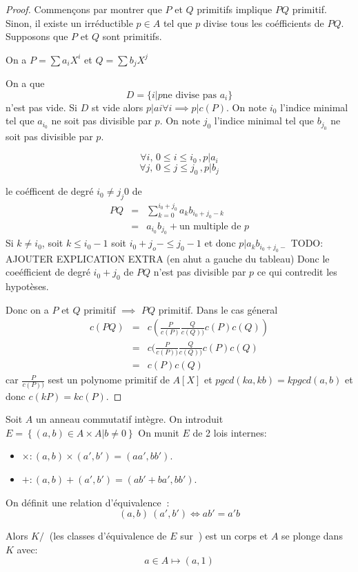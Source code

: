 \begin{proof}
	Commençons par montrer que $P$ et $Q$ primitifs implique $PQ$ primitif. \\
	Sinon, il existe un irréductible $p \in A $ tel que $p$ divise tous les coéfficients de $PQ$.
	Supposons que $P$ et $Q$ sont primitifs.

	On a $P = \sum a_iX^i$ et  $Q = \sum b_jX^j$

	On a que $$D = \{i | p \text{ne divise pas } a_i \}$$ n'est pas vide. Si $D$ st vide alors $p | ai \forall i \implies p | c(P)$.
	On note $i_0$ l'indice minimal tel que $a_{i_0}$ ne soit pas divisible par $p$.
	On note $j_0$ l'indice minimal tel que $b_{j_0}$ ne soit pas divisible par $p$.

	$$\forall i, \, 0 \leq i \leq i_0\,, p | a_i$$
	$$\forall j, \, 0 \leq j \leq j_0\,, p | b_j$$


	le coéfficent de degré $i_0 \neq j_j0$ de
	\begin{eqnarray*}
    PQ &=& \sum\limits^{i_0 + j_0}_{k=0} a_k b_{i_0 + j_0 - k} \\
		&=& a_{i_0}b_{j_0} + \text{un multiple de } p
	\end{eqnarray*}
	Si $k \neq i_0$, soit  $k\leq i_0 -1$ soit $i_0+j_o - \leq j_0 -1$ et donc $ p | a_kb_{i_0 + j_0 - }$
	TODO: AJOUTER EXPLICATION EXTRA (en ahut a gauche du tableau)
	Donc le coeéfficient de degré $i_0+j_0$ de $PQ$ n'est pas divisible par $p$ ce qui contredit les hypotèses.

	Donc on a $P$ et $Q$ primitif $\implies$ $PQ$ primitif.
	Dans le cas géneral
	\begin{eqnarray*}
		c(PQ) &=& c(\frac{P}{c(P)}\frac{Q}{c(Q))}c(P)c(Q))\\
		&=& c(\frac{P}{c(P))}\frac{Q}{c(Q))}c(P)c(Q)\\
		&=& c(P)c(Q)
	\end{eqnarray*}
	car $\frac{P}{c(P))}$ sest un polynome primitif de $A[X]$ et
	$pgcd(ka, kb) = k pgcd(a,b)$ et donc $c(kP) = kc(P)$.
\end{proof}


\begin{definition}
	Soit $A$ un anneau  commutatif intègre.
	On introduit $E = \left\{ (a,b) \in A\times A | b \neq 0 \right\}$ %
	On munit  $E$ de 2 lois internes:
	\begin{itemize}
		\item $\times : (a,b) \times (a', b') = (aa',bb')$.
		\item $+ : (a,b) + (a', b') = (ab' + ba',bb')$.
	\end{itemize}

	On définit une relation d'équivalence $~$:
	$$ (a,b) ~ (a',b') \iff ab' = a'b $$

	Alors $K/~$ (les classes d'équivalence de $E$ sur $~$) est un corps et $A$ se plonge dans $K$ avec:
	$$ a \in A  \mapsto (a,1 )$$ %
\end{definition}



